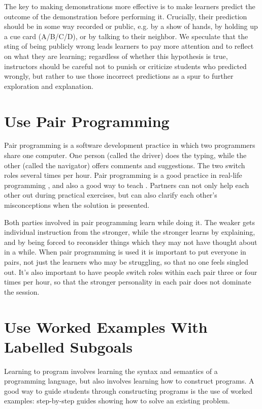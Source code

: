 The key to making demonstrations more effective is to make learners
predict the outcome of the demonstration before performing it.
Crucially, their prediction should be in some way recorded or public,
e.g. by a show of hands, by holding up a cue card (A/B/C/D), or by
talking to their neighbor.  We speculate that the sting of being
publicly wrong leads learners to pay more attention and to reflect on
what they are learning; regardless of whether this hypothesis is true,
instructors should be careful not to punish or criticize students who
predicted wrongly, but rather to use those incorrect predictions as a
spur to further exploration and explanation.

\section*{Use Pair Programming}

Pair programming is a software development practice in which two
programmers share one computer.  One person (called the driver) does
the typing, while the other (called the navigator) offers comments and
suggestions.  The two switch roles several times per hour.  Pair
programming is a good practice in real-life programming
\cite{Hann2009}, and also a good way to teach \cite{McDo2006}.
Partners can not only help each other out during practical exercises,
but can also clarify each other's misconceptions when the solution is
presented.

Both parties involved in pair programming learn while doing it.  The
weaker gets individual instruction from the stronger, while the
stronger learns by explaining, and by being forced to reconsider
things which they may not have thought about in a while.  When pair
programming is used it is important to put everyone in pairs, not just
the learners who may be struggling, so that no one feels singled out.
It's also important to have people switch roles within each pair three
or four times per hour, so that the stronger personality in each pair
does not dominate the session.

\section*{Use Worked Examples With Labelled Subgoals}

Learning to program involves learning the syntax and semantics of a
programming language, but also involves learning how to construct
programs.  A good way to guide students through constructing programs
is the use of worked examples: step-by-step guides showing how to
solve an existing problem.

